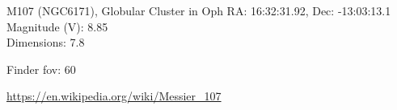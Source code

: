 \begin{block}{M107 (NGC6171), Globular Cluster in Oph}
    RA: 16:32:31.92, Dec: -13:03:13.1 \\ 
    Magnitude (V): 8.85 \\ 
    Dimensions: 7.8 

    Finder fov: 60 

    \url{https://en.wikipedia.org/wiki/Messier_107} 
\end{block}